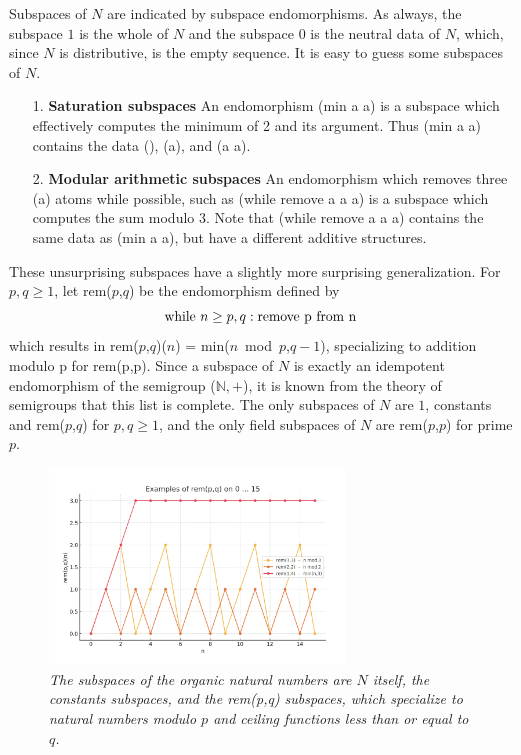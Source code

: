 \documentclass[11pt]{article}
\begin{document}
    Subspaces of $N$ are indicated by subspace endomorphisms.  As always, the subspace $1$ is the whole of $N$ and the subspace $0$ is the neutral data of $N$, which, 
since $N$ is distributive, is the empty sequence.  It is easy to guess some subspaces of $N$.
\begin{itemize} 
\item [1.] {\bf Saturation subspaces} An endomorphism (min a a) is a subspace which effectively computes the minimum of 2 and its argument.  Thus (min a a) contains the data (), (a), and (a a). 
\item [2.] {\bf Modular arithmetic subspaces} An endomorphism which removes three (a) atoms while possible, such as (while remove a a a) is a subspace which computes the sum modulo 3.  Note 
that (while remove a a a) contains the same data as (min a a), but have a different additive structures.  
\end{itemize}
These unsurprising subspaces have a slightly more surprising generalization.  For $p,q\ge 1$, let rem($p$,$q$) be the endomorphism defined by 
\begin{equation}
{\rm while}\ n\ge p,q: {\rm remove\ p\ from\ n}
\end{equation}
which results in rem($p$,$q$)($n$) = min($n$\ mod\ $p$,$q-1$), specializing to addition modulo p for rem(p,p).  Since a subspace of $N$ is exactly an idempotent 
endomorphism of the semigroup (${\mathbb N},+$), it is known from the theory of semigroups that this list is complete\cite{semigroup}.  The only subspaces of $N$ are $1$, constants and rem($p$,$q$) for $p,q\ge 1$, and the only field subspaces of $N$ are rem($p$,$p$) for prime $p$. 

\begin{figure}[h]
\centering
\includegraphics[width=0.7\textwidth]{rem.png}
\caption{{\it The subspaces of the organic natural numbers are $N$ itself, the constants subspaces, and the rem(p,q) subspaces, 
which specialize to natural numbers modulo $p$ and ceiling functions less than or equal to $q$.}} 
\end{figure}
\end{document}
